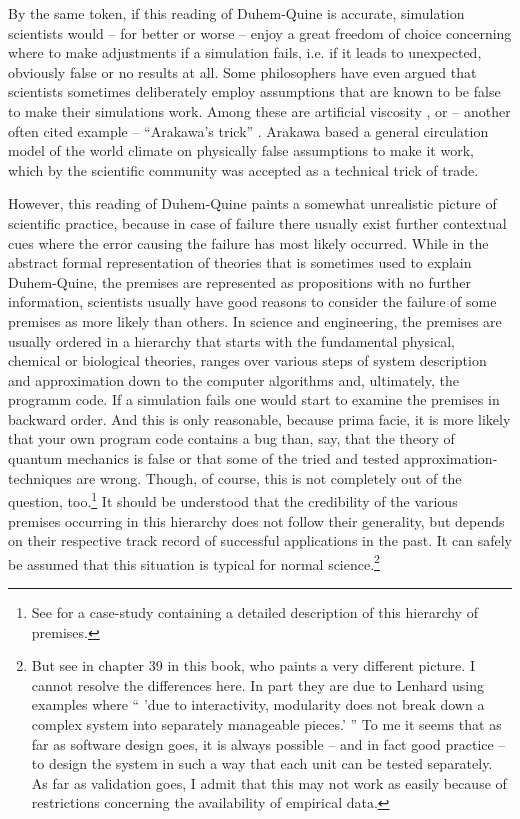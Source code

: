 \documentclass[12pt, a4paper]{article}
\begin{document}
By the same token, if this reading of Duhem-Quine is accurate,
simulation scientists would -- for better or worse -- enjoy a great
freedom of choice concerning where to make adjustments if a simulation
fails, i.e. if it leads to unexpected, obviously false or no results
at all. Some philosophers have even argued that scientists sometimes
deliberately employ assumptions that are known to be false to make
their simulations work. Among these are artificial viscosity
\citep[sec. 8]{winsberg:2015}, or -- another often cited example --
``Arakawa's trick'' \citep{lenhard:2007}. Arakawa based a general
circulation model of the world climate on physically false assumptions
to make it work, which by the scientific community was accepted as a
technical trick of trade.

However, this reading of Duhem-Quine paints a somewhat unrealistic
picture of scientific practice, because in case of failure there
usually exist further contextual cues where the error causing the
failure has most likely occurred. While in the abstract formal
representation of theories that is sometimes used to explain
Duhem-Quine, the premises are represented as propositions with no
further information, scientists usually have good reasons to consider
the failure of some premises as more likely than others. In science
and engineering, the premises are usually ordered in a hierarchy that
starts with the fundamental physical, chemical or biological theories,
ranges over various steps of system description and approximation down
to the computer algorithms and, ultimately, the programm code. If a
simulation fails one would start to examine the premises in backward
order. And this is only reasonable, because prima facie, it is more
likely that your own program code contains a bug than, say, that the
theory of quantum mechanics is false or that some of the tried and
tested approximation-techniques are wrong. Though, of course, this is
not completely out of the question, too.\footnote{See \citet[sec.
3.4]{arnold-kaestner:2013} for a case-study containing a detailed
description of this hierarchy of premises.} It should be understood
that the credibility of the various premises occurring in this
hierarchy does not follow their generality, but depends on their
respective track record of successful applications in the past. It can
safely be assumed that this situation is typical for normal
science.\footnote{But see \citet{lenhard:2019} in chapter 39 in this
book, who paints a very different picture. I cannot resolve the
differences here. In part they are due to Lenhard using examples where
`` 'due to  interactivity, modularity  does not  break down  a
complex  system  into separately manageable  pieces.' '' To me it
seems that as far as software design goes, it is always possible --
and in fact good practice -- to design the system in such a way that
each unit can be tested separately. As far as validation goes, I admit
that this may not work as easily because of restrictions concerning
the availability of empirical data.}
\end{document}
